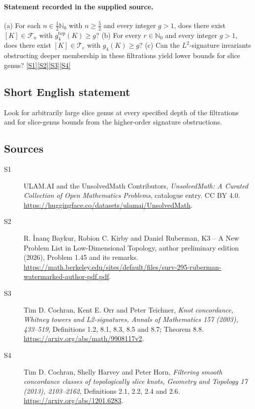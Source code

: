 \documentclass[11pt]{article}
\newcommand{\sref}[2]{\hyperlink{source:#1:#2}{[S#2]}}
\begin{document}
\paragraph{Statement recorded in the supplied source.}
(a) For each $n\in\tfrac12\mathbb N_0$ with $n\geq\tfrac52$ and every integer $g>1$, does there exist $[K]\in\mathcal F_n$ with $g_4^{\mathrm{top}}(K)\geq g$? (b) For every $r\in\mathbb N_0$ and every integer $g>1$, does there exist $[K]\in\mathcal T_r$ with $g_4(K)\geq g$? (c) Can the $L^2$-signature invariants obstructing deeper membership in these filtrations yield lower bounds for slice genus? \sref{statement}{1}\sref{statement}{2}\sref{statement}{3}\sref{statement}{4}
\subsection{Short English statement}
Look for arbitrarily large slice genus at every specified depth of the filtrations and for slice-genus bounds from the higher-order signature obstructions.
\subsection{Sources}
\begin{description}
\item[\hypertarget{source:statement:1}{S1}] ULAM.AI and the UnsolvedMath Contributors, \emph{UnsolvedMath: A Curated Collection of Open Mathematics Problems}, catalogue entry. CC BY 4.0. \url{https://huggingface.co/datasets/ulamai/UnsolvedMath}.
\item[\hypertarget{source:statement:2}{S2}] R. \.{I}nan\c{c} Baykur, Robion C. Kirby and Daniel Ruberman, K3 -- A New Problem List in Low-Dimensional Topology, author preliminary edition (2026), Problem 1.45 and its remarks. \url{https://math.berkeley.edu/sites/default/files/surv-295-ruberman-watermarked-author-pdf.pdf}.
\item[\hypertarget{source:statement:3}{S3}] Tim D. Cochran, Kent E. Orr and Peter Teichner, \emph{Knot concordance, Whitney towers and L2-signatures, Annals of Mathematics 157 (2003), 433--519}, Definitions 1.2, 8.1, 8.3, 8.5 and 8.7; Theorem 8.8. \url{https://arxiv.org/abs/math/9908117v2}.
\item[\hypertarget{source:statement:4}{S4}] Tim D. Cochran, Shelly Harvey and Peter Horn, \emph{Filtering smooth concordance classes of topologically slice knots, Geometry and Topology 17 (2013), 2103--2162}, Definitions 2.1, 2.2, 2.4 and 2.6. \url{https://arxiv.org/abs/1201.6283}.
\end{description}
\label{end:statement}
\end{document}
